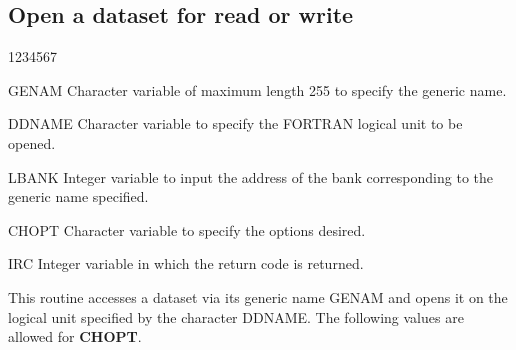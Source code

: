 \subsection{Open a dataset for read or write}
\begin{DLtt}{1234567}
\item[GENAM]
Character variable of maximum length 255 to specify the generic name.
\item[DDNAME]
Character variable to specify the FORTRAN logical unit to be opened.
\item[LBANK]
Integer variable to input the address of the bank corresponding
to the generic name specified.
\item[CHOPT]
Character variable to specify the options desired.
\item[IRC ]
Integer variable in which the return code is returned.
\end{DLtt}
\par
This routine accesses a dataset via its generic name GENAM and opens it
on the logical unit specified by the character DDNAME.
The following values are allowed for {\bf CHOPT}.
